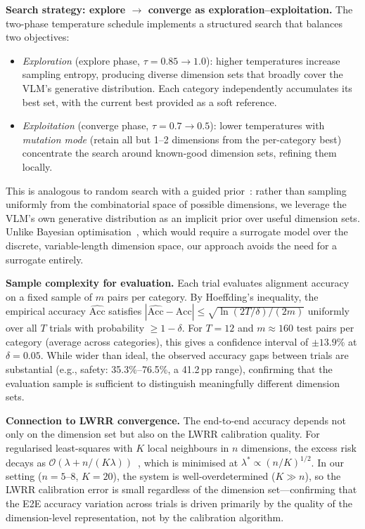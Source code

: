 \documentclass[runningheads]{llncs}
\begin{document}
\smallskip\noindent\textbf{Search strategy: explore $\to$ converge as exploration--exploitation.}
The two-phase temperature schedule implements a structured search that balances two objectives:
\begin{itemize}
    \item \emph{Exploration} (explore phase, $\tau{=}0.85 \to 1.0$): higher temperatures increase sampling entropy, producing diverse dimension sets that broadly cover the VLM's generative distribution. Each category independently accumulates its best set, with the current best provided as a soft reference.
    \item \emph{Exploitation} (converge phase, $\tau{=}0.7 \to 0.5$): lower temperatures with \emph{mutation mode} (retain all but 1--2 dimensions from the per-category best) concentrate the search around known-good dimension sets, refining them locally.
\end{itemize}
This is analogous to random search with a guided prior~\cite{bergstra2012random}: rather than sampling uniformly from the combinatorial space of possible dimensions, we leverage the VLM's own generative distribution as an implicit prior over useful dimension sets.
Unlike Bayesian optimisation~\cite{snoek2012practical}, which would require a surrogate model over the discrete, variable-length dimension space, our approach avoids the need for a surrogate entirely.

\smallskip\noindent\textbf{Sample complexity for evaluation.}
Each trial evaluates alignment accuracy on a fixed sample of $m$ pairs per category.
By Hoeffding's inequality, the empirical accuracy $\widehat{\mathrm{Acc}}$ satisfies $|\widehat{\mathrm{Acc}} - \mathrm{Acc}| \leq \sqrt{\ln(2T/\delta)/(2m)}$ uniformly over all $T$ trials with probability $\geq 1-\delta$.
For $T{=}12$ and $m{\approx}160$ test pairs per category (average across categories), this gives a confidence interval of $\pm 13.9$\% at $\delta{=}0.05$.
While wider than ideal, the observed accuracy gaps between trials are substantial (e.g., safety: 35.3\%--76.5\%, a 41.2\,pp range), confirming that the evaluation sample is sufficient to distinguish meaningfully different dimension sets.

\smallskip\noindent\textbf{Connection to LWRR convergence.}
The end-to-end accuracy depends not only on the dimension set but also on the LWRR calibration quality.
For regularised least-squares with $K$ local neighbours in $n$ dimensions, the excess risk decays as $\mathcal{O}(\lambda + n/(K\lambda))$~\cite{caponnetto2007optimal,hoerl1970ridge}, which is minimised at $\lambda^* \propto (n/K)^{1/2}$.
In our setting ($n{=}5$--$8$, $K{=}20$), the system is well-overdetermined ($K \gg n$), so the LWRR calibration error is small regardless of the dimension set---confirming that the E2E accuracy variation across trials is driven primarily by the quality of the dimension-level representation, not by the calibration algorithm.
\end{document}
